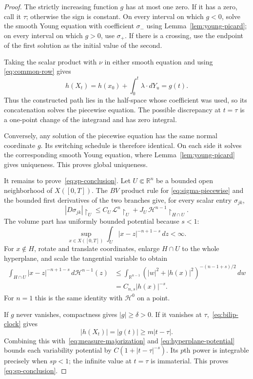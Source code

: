\documentclass[11pt]{article}
\newcommand{\R}{\mathbb{R}}
\newcommand{\HH}{\mathcal{H}}
\begin{document}
\begin{proof}
The strictly increasing function $g$ has at most one zero.  If it has a zero,
call it $\tau$; otherwise the sign is constant.  On every interval on which
$g<0$, solve the smooth Young equation with coefficient $\sigma_-$ using
Lemma~\ref{lem:young-picard}; on every interval on which $g>0$, use
$\sigma_+$.  If there is a crossing, use the endpoint of the first solution as
the initial value of the second.

Taking the scalar product with $\nu$ in either smooth equation and using
\eqref{eq:common-row} gives
\[
 h(X_t)=h(x_0)+\int_0^t\lambda\cdot dY_u=g(t).
\]
Thus the constructed path lies in the half-space whose coefficient was used,
so its concatenation solves the piecewise equation.  The possible discrepancy
at $t=\tau$ is a one-point change of the integrand and has zero integral.

Conversely, any solution of the piecewise equation has the same normal
coordinate $g$.  Its switching schedule is therefore identical.  On each
side it solves the corresponding smooth Young equation, where
Lemma~\ref{lem:young-picard} gives uniqueness.  This proves global uniqueness.

It remains to prove~\eqref{eq:sp-conclusion}.  Let $U\Subset\R^n$ be a bounded
open neighborhood of $X([0,T])$.  The $BV$ product rule for
\eqref{eq:sigma-piecewise} and the bounded first derivatives of the two
branches give, for every scalar entry $\sigma_{jk}$,
\begin{equation}\label{eq:measure-majorization}
 |D\sigma_{jk}|\!\restriction_U
 \leq C_U\,\mathcal L^n\!\restriction_U
   +J_U\,\HH^{n-1}\!\restriction_{H\cap U}.
\end{equation}
The volume part has uniformly bounded potential because $s<1$:
\[
 \sup_{x\in X([0,T])}\int_U|x-z|^{-n+1-s}\,dz<\infty.
\]
For $x\notin H$, rotate and translate coordinates, enlarge $H\cap U$ to the
whole hyperplane, and scale the tangential variable to obtain
\begin{align}\label{eq:hyperplane-potential}
 \int_{H\cap U}|x-z|^{-n+1-s}\,d\HH^{n-1}(z)
 &\leq \int_{\R^{n-1}}
 (|w|^2+|h(x)|^2)^{-(n-1+s)/2}\,dw\\
 &=C_{n,s}|h(x)|^{-s}.
\end{align}
For $n=1$ this is the same identity with $\HH^0$ on a point.

If $g$ never vanishes, compactness gives $|g|\geq\delta>0$.  If it vanishes
at $\tau$,~\eqref{eq:bilip-clock} gives
\[
 |h(X_t)|=|g(t)|\geq m|t-\tau|.
\]
Combining this with~\eqref{eq:measure-majorization} and
\eqref{eq:hyperplane-potential} bounds each variability potential by
$C(1+|t-\tau|^{-s})$.  Its $p$th power is integrable precisely when $sp<1$;
the infinite value at $t=\tau$ is immaterial.  This proves
\eqref{eq:sp-conclusion}.


\end{proof}
\end{document}
